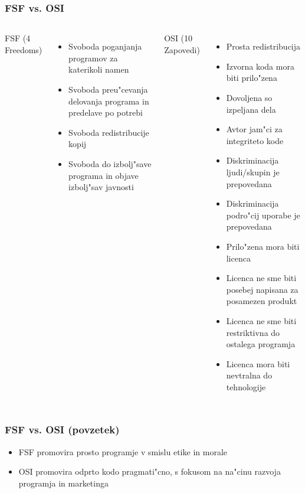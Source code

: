 \documentclass{beamer}
\begin{document}
\begin{frame}
\frametitle{FSF vs. OSI}
\tiny
\begin{columns}[l]
FSF (4 Freedoms)
\begin{itemize}
\item Svoboda poganjanja programov za katerikoli namen
\item Svoboda preu"cevanja delovanja programa in predelave po potrebi
\item Svoboda redistribucije kopij
\item Svoboda do izbolj"save programa in objave izbolj"sav javnosti
\end{itemize}
OSI (10 Zapovedi)
\begin{itemize}
\item Prosta redistribucija
\item Izvorna koda mora biti prilo"zena
\item Dovoljena so izpeljana dela
\item Avtor jam"ci za integriteto kode
\item Diskriminacija ljudi/skupin je prepovedana
\item Diskriminacija podro"cij uporabe je prepovedana
\item Prilo"zena mora biti licenca
\item Licenca ne sme biti posebej napisana za posamezen produkt
\item Licenca ne sme biti restriktivna do ostalega programja
\item Licenca mora biti nevtralna do tehnologije
\end{itemize}
\end{columns}
\end{frame}

\begin{frame}
\frametitle{FSF vs. OSI (povzetek)}
\begin{block}{}
\begin{itemize}
\item FSF promovira prosto programje v smislu etike in morale
\item OSI promovira odprto kodo pragmati"cno, s fokusom na na"cinu razvoja programja in marketinga
\end{itemize}
\end{block}
\end{frame}
\end{document}
